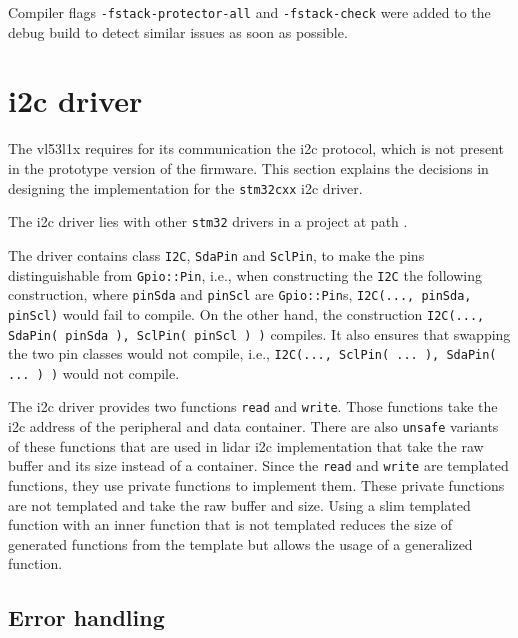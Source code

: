 \documentclass[
  digital,     %
  oneside,     %
  nosansbold,  %
  nocolorbold, %
  nolof,         %
  nolot,         %
]{fithesis4}
\begin{document}
{{{Compiler flags \lstinline|-fstack-protector-all| and \lstinline|-fstack-check| were added to the debug build to detect similar issues as soon as possible.

\section[ I2C driver ]{ \acrshort{i2c} driver }

The \gls{vl53l1x} requires for its communication the \acrshort{i2c} protocol, which is not present in the prototype version of the firmware. This section explains the decisions in designing the implementation for the \lstinline|stm32cxx| \acrshort{i2c} driver. 

The \acrshort{i2c} driver lies with other \verb|stm32| drivers in a project at path .

The driver contains class \lstinline|I2C|, \lstinline|SdaPin| and \lstinline|SclPin|, to make the pins distinguishable from \lstinline|Gpio::Pin|, i.e., when constructing the \lstinline|I2C| the following construction, where \lstinline|pinSda| and \lstinline|pinScl| are \lstinline|Gpio::Pin|s, \lstinline|I2C(..., pinSda, pinScl)| would fail to compile. On the other hand, the construction \lstinline|I2C(..., SdaPin( pinSda ), SclPin( pinScl ) )| compiles. It also ensures that swapping the two pin classes would not compile, i.e., \lstinline|I2C(..., SclPin( ... ), SdaPin( ... ) )| would not compile.

The \acrshort{i2c} driver provides two functions \lstinline|read| and \lstinline|write|. Those functions take the \acrshort{i2c} address of the peripheral and data container. There are also \lstinline|unsafe| variants of these functions that are used in \acrshort{lidar} \acrshort{i2c} implementation %
that take the raw buffer and its size instead of a container. Since the \lstinline|read| and \lstinline|write| are templated functions, they use private functions to implement them. These private functions are not templated and take the raw buffer and size. Using a slim templated function with an inner function that is not templated reduces the size of generated functions from the template but allows the usage of a generalized function.

\subsection{ Error handling }

}}}
\end{document}
